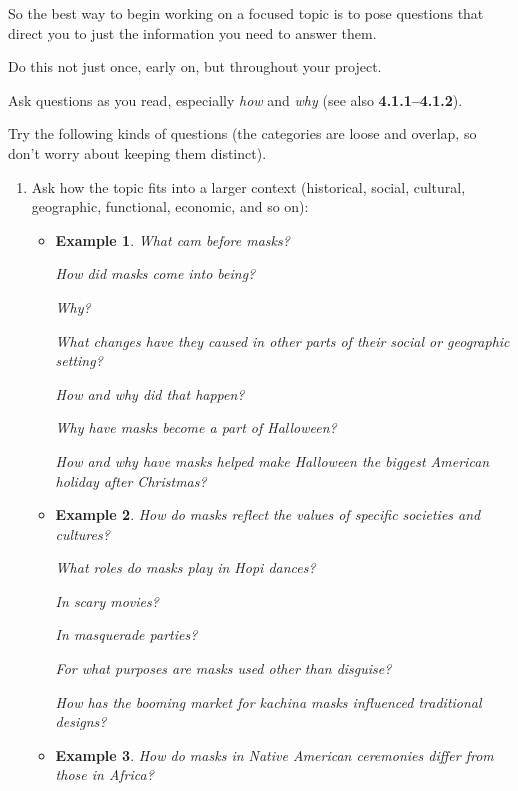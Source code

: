\documentclass[oneside]{book}
\numberwithin{equation}{section}
\newtheorem{example}{Example}[section]
\begin{document}
So the best way to begin working on a focused topic is to pose questions that direct you to just the information you need to answer them.

%
Do this not just once, early on, but throughout your project.

Ask questions as you read, especially \textit{how} and \textit{why} (see also \textbf{4.1.1--4.1.2}).

Try the following kinds of questions (the categories are loose and overlap, so don't worry about keeping them distinct).
\begin{enumerate}
    \item Ask how the topic fits into a larger context (historical, social, cultural, geographic, functional, economic, and so on):
    \begin{itemize}
        \item {}
        \begin{example}
            What cam before masks?
            
            How did masks come into being?
            
            Why?
            
            What changes have they caused in other parts of their social or geographic setting?
            
            How and why did that happen?
            
            Why have masks become a part of Halloween?
            
            How and why have masks helped make Halloween the biggest American holiday after Christmas?
        \end{example}
        \item {}
        \begin{example}
            How do masks reflect the values of specific societies and cultures?
            
            What roles do masks play in Hopi dances?
            
            In scary movies?
            
            In masquerade parties?
            
            For what purposes are masks used other than disguise?
            
            How has the booming market for kachina masks influenced traditional designs?
        \end{example}
        \item {}
        \begin{example}
            How do masks in Native American ceremonies differ from those in Africa?
            

\end{example}
\end{itemize}
\end{enumerate}
\end{document}
